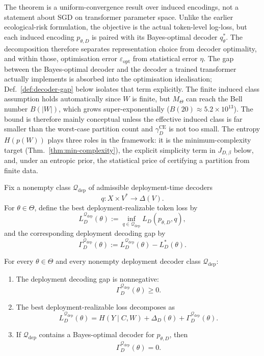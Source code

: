 \documentclass[twoside,11pt]{article}
\newcommand{\CE}{\mathrm{CE}}
\newcommand{\thmref}[1]{Thm.~\ref{#1}}
\newcommand{\defref}[1]{Def.~\ref{#1}}
\begin{document}
The theorem is a uniform-convergence result over induced encodings, not a statement about SGD on transformer parameter space. Unlike the earlier ecological-risk formulation, the objective is the actual token-level log-loss, but each induced encoding $p_{\theta,D}$ is paired with its Bayes-optimal decoder $q_{\theta}^*$. The decomposition therefore separates representation choice from decoder optimality, and within those, optimisation error $\varepsilon_{\mathrm{opt}}$ from statistical error $\eta$. The gap between the Bayes-optimal decoder and the decoder a trained transformer actually implements is absorbed into the optimisation idealisation; \defref{def:decoder-gap} below isolates that term explicitly. The finite induced class assumption holds automatically since $W$ is finite, but $M_\Theta$ can reach the Bell number $B(|W|)$, which grows super-exponentially ($B(20) \approx 5.2 \times 10^{13}$). The bound is therefore mainly conceptual unless the effective induced class is far smaller than the worst-case partition count and $\gamma_D^{\CE}$ is not too small. The entropy $H(p(W))$ plays three roles in the framework: it is the minimum-complexity target (\thmref{thm:min-complexity}), the explicit simplicity term in $J_{D,\beta}$ below, and, under an entropic prior, the statistical price of certifying a partition from finite data.

\begin{definition}\label{def:decoder-gap}
Fix a nonempty class $\mathcal{Q}_{\mathrm{dep}}$ of admissible deployment-time decoders
\[
q \colon X \times V^* \to \Delta(V).
\]
For $\theta \in \Theta$, define the best deployment-realizable token loss by
\[
L_D^{\mathcal{Q}_{\mathrm{dep}}}(\theta)
:= \inf_{q \in \mathcal{Q}_{\mathrm{dep}}}
   L_D(p_{\theta,D},q),
\]
and the corresponding deployment decoding gap by
\[
\Gamma_D^{\mathcal{Q}_{\mathrm{dep}}}(\theta)
:= L_D^{\mathcal{Q}_{\mathrm{dep}}}(\theta) - L_D^*(\theta).
\]
\end{definition}

\begin{proposition}\label{prop:decoder-gap}
For every $\theta \in \Theta$ and every nonempty deployment decoder class $\mathcal{Q}_{\mathrm{dep}}$:
\begin{enumerate}[label=(\alph*)]
\item The deployment decoding gap is nonnegative:
\[
\Gamma_D^{\mathcal{Q}_{\mathrm{dep}}}(\theta)\ge 0.
\]

\item The best deployment-realizable loss decomposes as
\[
L_D^{\mathcal{Q}_{\mathrm{dep}}}(\theta)
= H(Y \mid C,W)
  + \Delta_D(\theta)
  + \Gamma_D^{\mathcal{Q}_{\mathrm{dep}}}(\theta).
\]

\item If $\mathcal{Q}_{\mathrm{dep}}$ contains a Bayes-optimal decoder for $p_{\theta,D}$, then
\[
\Gamma_D^{\mathcal{Q}_{\mathrm{dep}}}(\theta)=0.
\]
\end{enumerate}
\end{proposition}
\end{document}

